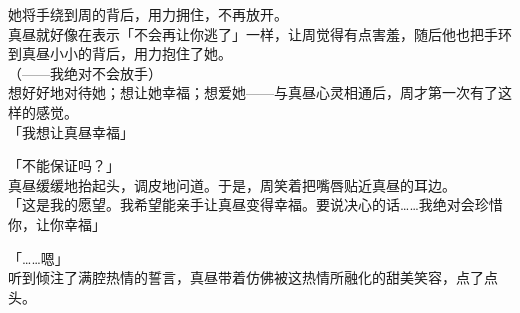 她将手绕到周的背后，用力拥住，不再放开。\\

真昼就好像在表示「不会再让你逃了」一样，让周觉得有点害羞，随后他也把手环到真昼小小的背后，用力抱住了她。\\

（——我绝对不会放手）\\

想好好地对待她；想让她幸福；想爱她——与真昼心灵相通后，周才第一次有了这样的感觉。\\

「我想让真昼幸福」

「不能保证吗？」\\

真昼缓缓地抬起头，调皮地问道。于是，周笑着把嘴唇贴近真昼的耳边。\\

「这是我的愿望。我希望能亲手让真昼变得幸福。要说决心的话……我绝对会珍惜你，让你幸福」

「……嗯」\\

听到倾注了满腔热情的誓言，真昼带着仿佛被这热情所融化的甜美笑容，点了点头。
